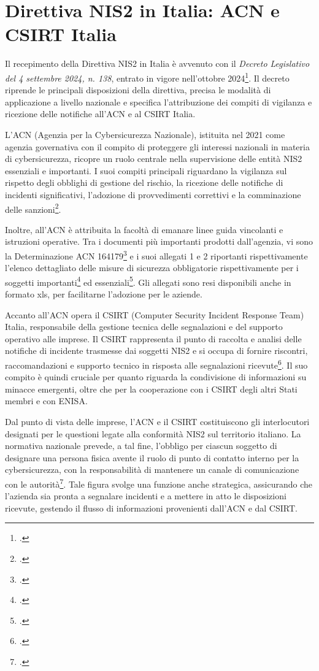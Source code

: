 \section{Direttiva NIS2 in Italia: ACN e CSIRT Italia}
Il recepimento della Direttiva NIS2 in Italia è avvenuto con il 
\textit{Decreto Legislativo del 4 settembre 2024, n. 138}, entrato in vigore nell'ottobre 2024\footcite{dlgs138}.
Il decreto riprende le principali disposizioni della direttiva, precisa le modalità di applicazione a livello nazionale
e specifica l'attribuzione dei compiti di vigilanza e ricezione delle notifiche all'ACN e al CSIRT Italia.

L’ACN (Agenzia per la Cybersicurezza Nazionale), istituita nel 2021 come agenzia governativa con il compito di proteggere gli interessi nazionali 
in materia di cybersicurezza, ricopre un ruolo centrale nella supervisione delle entità NIS2 essenziali e importanti. 
I suoi compiti principali riguardano la vigilanza sul rispetto degli obblighi di gestione del rischio, 
la ricezione delle notifiche di incidenti significativi, l’adozione di provvedimenti correttivi e 
la comminazione delle sanzioni\footcite{dlgs138}. 

Inoltre, all’ACN è attribuita la facoltà di emanare linee guida vincolanti e istruzioni operative. Tra i documenti
più importanti prodotti dall'agenzia, vi sono la Determinazione ACN 164179\footcite{det-acn} e i suoi allegati 1 e 2
riportanti rispettivamente l'elenco dettagliato delle misure di sicurezza obbligatorie rispettivamente
per i soggetti importanti\footcite{det-acn-allegato1} ed essenziali\footcite{det-acn-allegato2}. Gli allegati sono resi disponibili anche
in formato xls, per facilitarne l'adozione per le aziende.

Accanto all’ACN opera il CSIRT (Computer Security Incident Response Team) Italia, 
responsabile della gestione tecnica delle segnalazioni e del supporto operativo alle imprese. 
Il CSIRT rappresenta il punto di raccolta e analisi delle notifiche 
di incidente trasmesse dai soggetti NIS2 e si occupa di fornire riscontri, raccomandazioni e 
supporto tecnico in risposta alle segnalazioni ricevute\footcite[art. 24]{dlgs138}.
Il suo compito è quindi cruciale per quanto riguarda la condivisione di informazioni su minacce emergenti, 
oltre che per la cooperazione con i CSIRT degli altri Stati membri e con ENISA.

Dal punto di vista delle imprese, l’ACN e il CSIRT costituiscono gli interlocutori designati 
per le questioni legate alla conformità NIS2 sul territorio italiano.
La normativa nazionale prevede, a tal fine, l’obbligo per ciascun soggetto 
di designare una persona fisica avente il ruolo di punto di contatto interno per la cybersicurezza,
con la responsabilità di mantenere un canale di comunicazione con le autorità\footcite[art. 21]{dlgs138}. 
Tale figura svolge una funzione anche strategica, assicurando che l’azienda sia pronta a 
segnalare incidenti e a mettere in atto le disposizioni ricevute, gestendo il flusso 
di informazioni provenienti dall’ACN e dal CSIRT.



